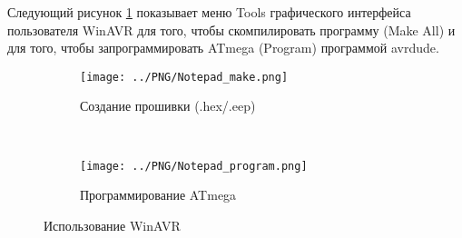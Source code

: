 Следующий рисунок \ref{fig:WinAVR2} показывает меню Tools графического интерфейса пользователя WinAVR для того, чтобы 
скомпилировать программу (Make All) и для того, чтобы запрограммировать ATmega (Program) программой avrdude.

\begin{figure}[H]
  \begin{subfigure}[b]{.5\textwidth}
    \centering
    \texttt{[image: ../PNG/Notepad\_make.png]}
    \caption{Создание прошивки (.hex/.eep)}
  \end{subfigure}
  ~
  \begin{subfigure}[b]{.5\textwidth}
    \centering
    \texttt{[image: ../PNG/Notepad\_program.png]}
    \caption{Программирование ATmega}
  \end{subfigure}
  \caption{Использование WinAVR}
  \label{fig:WinAVR2}
\end{figure}

